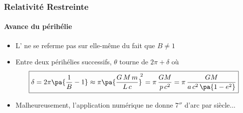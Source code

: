 \begin{frame}
\frametitle{Relativité Restreinte}
\framesubtitle{Avance du périhélie}

\begin{itemize}
	\item	<1->	L' ne se referme pas sur elle-même du fait que $B\neq1$
	\item	<2->	Entre deux périhélies successifs, $\theta$ tourne de $2\pi +\delta$ où
	\onslide<3->
	$$
	\boxed{
    \delta = 2\pi\pa{\frac{1}{B} - 1}
    \approx \pi \pa{\frac{G\, M\, m}{L\, c}}^{\!\!2} 
    = \pi \, \frac{G M}{p\, c^2}
    = \pi\, \frac{G M}{a\, c^2\, \pa{1-e^2}}	
    }
	$$
	
	\item	<4-> Malheureusement, l'application numérique ne donne  
	$7''$ d'arc par siècle...
	
\end{itemize}

\end{frame}
